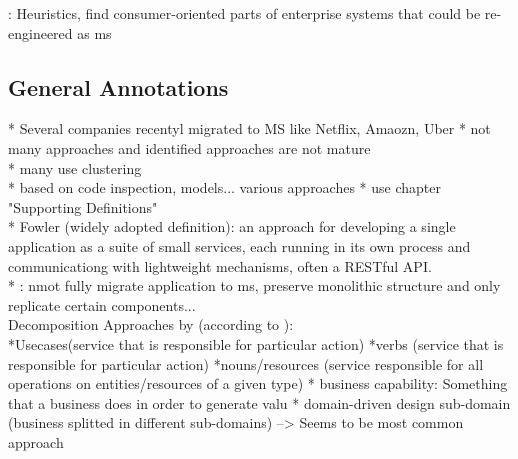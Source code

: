\cite{HeuristicsAlwis}: Heuristics, find consumer-oriented parts of enterprise systems that could be re-engineered as ms



\subsection{General Annotations}
* Several companies recentyl migrated to MS like Netflix, Amaozn, Uber
* not many approaches and identified approaches are not mature\\
* many use clustering \\
* based on code inspection, models... various approaches
* use chapter "Supporting Definitions"\\
* Fowler (widely adopted definition): an approach for developing a single application as a suite of small services, each running in its own process and communicationg with lightweight mechanisms, often a RESTful API. \\
* \cite{interfaceAnalysisBaresi}: nmot fully migrate application to ms, preserve monolithic structure and only replicate certain components... \\
Decomposition Approaches by (according to \cite{FunctionalDecompositionHeinrich}): \\
*Usecases(service that is responsible for particular action) 
*verbs (service that is responsible for particular action)
*nouns/resources (service responsible for all operations on entities/resources of a given type)
* business capability: Something that a business does in order to generate valu
* domain-driven design sub-domain (business splitted in different sub-domains) --> Seems to be most common approach


